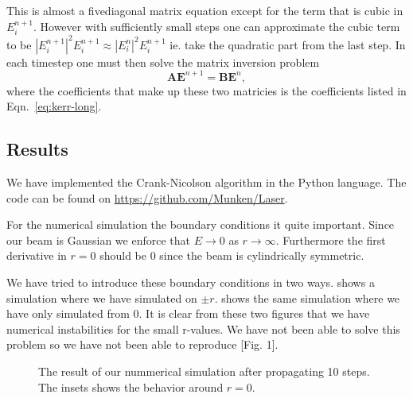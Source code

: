 This is almost a fivediagonal matrix equation except for the term that is cubic in
$E_{i}^{n+1}$. However with sufficiently small steps one can approximate the cubic term to be
$|E_{i}^{n+1}|^{2}E_{i}^{n+1} \approx |E_{i}^{n}|^{2}E_{i}^{n+1}$ ie. take the quadratic part from
the last step. In each timestep one must then solve the matrix inversion problem
\begin{equation}
  \label{eq:matrix}
  \mathbf{A} \mathbf{E}^{n+1} = \mathbf{B} \mathbf{E}^{n}, 
\end{equation}
where the coefficients that make up these two matricies is the coefficients listed in
Eqn.~\eqref{eq:kerr-long}. 

\subsection{Results}
\label{sec:kerr-results}

We have implemented the Crank-Nicolson algorithm in the Python language. The code can be found on
\url{https://github.com/Munken/Laser}.

For the numerical simulation the boundary conditions it quite important. Since our beam is Gaussian
we enforce that $E \rightarrow 0$ as $r \rightarrow \infty$. Furthermore the first derivative in $r
= 0$ should be 0 since the beam is cylindrically symmetric.

We have tried to introduce these boundary conditions in two ways.  shows a
simulation where we have simulated on $\pm r$.  shows the same simulation
where we have only simulated from 0. It is clear from these two figures that we have numerical
instabilities for the small r-values. We have not been able to solve this problem so we have not
been able to reproduce \cite{prl-selffocus}[Fig. 1]. 
\begin{figure}[htb]
  \centering
  \hfill
  \caption{The result of our nummerical simulation after propagating 10 steps. The insets shows the
    behavior around $r=0$.}
  \label{fig:kerr-num}
\end{figure}



